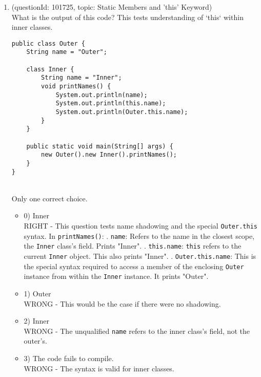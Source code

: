 \documentclass[12pt]{article}
\begin{document}
\begin{enumerate}[label=(\arabic*)]
\begin{itemize}
\end{itemize}
\item (questionId: 101725, topic: Static Members and 'this' Keyword) \\ 
What is the output of this code? This tests understanding of `this` within inner classes.\n\begin{verbatim}
public class Outer {
    String name = "Outer";

    class Inner {
        String name = "Inner";
        void printNames() {
            System.out.println(name);
            System.out.println(this.name);
            System.out.println(Outer.this.name);
        }
    }

    public static void main(String[] args) {
        new Outer().new Inner().printNames();
    }
}
\end{verbatim}
\\ \noindent Only one correct choice. 
\begin{itemize}
\item 0) Inner\nInner\nOuter
 \\ 
RIGHT - This question tests name shadowing and the special \verb|Outer.this| syntax. In \verb|printNames()|: . \verb|name|: Refers to the name in the closest scope, the \verb|Inner| class's field. Prints "Inner". . \verb|this.name|: \verb|this| refers to the current \verb|Inner| object. This also prints "Inner". . \verb|Outer.this.name|: This is the special syntax required to access a member of the enclosing \verb|Outer| instance from within the \verb|Inner| instance. It prints "Outer".

\item 1) Outer\nOuter\nOuter
 \\ 
WRONG - This would be the case if there were no shadowing.

\item 2) Inner\nOuter\nOuter
 \\ 
WRONG - The unqualified \verb|name| refers to the inner class's field, not the outer's.

\item 3) The code fails to compile.
 \\ 
WRONG - The syntax is valid for inner classes.


\end{itemize}
\end{enumerate}
\end{document}

